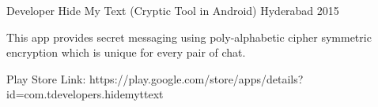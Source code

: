 \begin{cventries}
  \cventry
    {Developer} %
    {Hide My Text (Cryptic Tool in Android)} %
    {Hyderabad} %
    {2015} %
    {
      \begin{cvitems} %
        \item {This app provides secret messaging using poly-alphabetic cipher symmetric encryption which is unique for every pair of chat.}
        \item{
        Play Store Link: https://play.google.com/store/apps/details?id=com.tdevelopers.hidemyttext}
      \end{cvitems}
    }
\end{cventries}
